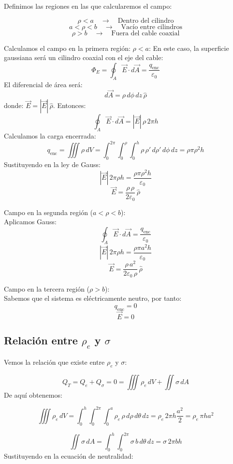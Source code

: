 \documentclass[a4paper,12pt]{article}
\begin{document}
\medskip
\noindent
Definimos las regiones en las que calcularemos el campo:

\[
\rho < a \quad \rightarrow \quad \text{Dentro del cilindro}
\]
\[
a < \rho < b \quad \rightarrow \quad \text{Vacío entre cilindros}
\]
\[
\rho > b \quad \rightarrow \quad \text{Fuera del cable coaxial}
\]

\noindent
Calculamos el campo en la primera región: \(\rho < a\):
\noindent
En este caso, la superficie gaussiana será un cilindro coaxial con el eje del cable:
\[
\Phi_E = \oint_{A} \vec E \cdot d\vec A = \frac{q_{\text{enc}}}{\varepsilon_0}
\]
El diferencial de área será:
\[
d\vec{A} = \rho\, d\phi\, dz \, \hat{\rho}
\]
donde: \qquad\(\vec{E} = |\vec{E}|\,\hat{\rho}\).
\newpage
\noindent
Entonces:
\[
\oint_{A} \vec{E}\cdot d\vec{A} = |\vec{E}|\,\rho\, 2\pi h
\]
Calculamos la carga encerrada:
\[
q_{\text{enc}} = \iiint \rho\, dV = \int_{0}^{2\pi}\!\!\int_{0}^{\rho}\!\!\int_{0}^{h} \rho\, \rho'\, d\rho'\, d\phi\, dz
= \rho \pi \rho^{2} h
\]
Sustituyendo en la ley de Gauss:
\[
|\vec{E}|\, 2\pi \rho h = \frac{\rho \pi \rho^{2} h}{\varepsilon_0}
\]
\[
\boxed{\vec{E} = \frac{\rho\,\rho}{2\varepsilon_0}\,\hat{\rho}}
\]

\medskip
\noindent
Campo en la segunda región (\(a < \rho < b\)):\\
\noindent
Aplicamos Gauss:
\[
\oint_{A} \vec{E}\cdot d\vec{A} = \frac{q_{\text{enc}}}{\varepsilon_0}
\]
\[
|\vec{E}|\, 2\pi \rho h = \frac{\rho \pi a^{2} h}{\varepsilon_0}
\]
\[
\boxed{\vec{E} = \frac{\rho\,a^{2}}{2\varepsilon_0\,\rho}\,\hat{\rho}}
\]

\medskip
\noindent
Campo en la tercera región (\(\rho > b\)):\\
\noindent
Sabemos que el sistema es eléctricamente neutro, por tanto:
\[
q_{\text{enc}} = 0
\]
\[
\boxed{\vec{E} = 0}
\]
\subsection*{Relación entre \(\rho_e\) y \(\sigma\)}
\noindent
Vemos la relación que existe entre \(\rho_e\) y \(\sigma\):

\[
Q_T = Q_e + Q_\sigma = 0 = \iiint \rho_e\, dV + \iint \sigma\, dA
\]
De aquí obtenemos:

\[
\iiint \rho_e\, dV = \int_0^h \int_0^{2\pi} \int_0^a \rho_e\, \rho\, d\rho\, d\theta\, dz 
= \rho_e\, 2\pi h \frac{a^{2}}{2} = \rho_e\, \pi h a^{2}
\]

\[
\iint \sigma\, dA = \int_0^h \int_0^{2\pi} \sigma\, b\, d\theta\, dz = \sigma\, 2\pi b h
\]
Sustituyendo en la ecuación de neutralidad:
\end{document}
